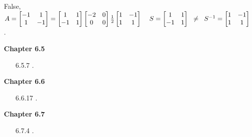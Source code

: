 \documentclass[10pt,twoside,reqno]{article}
\begin{document}
\begin{enumerate}
{%
{\addtolength{\leftskip}{5mm}
False, 
$
A=
\begin{bmatrix}
-1&1\\
1&-1\\
\end{bmatrix}
=
\begin{bmatrix}
1&1\\
-1&1\\
\end{bmatrix}
\begin{bmatrix}
-2&0\\
0&0\\
\end{bmatrix}
\frac{1}{2}
\begin{bmatrix}
1&-1\\
1&1\\
\end{bmatrix}
\hspace{4mm}
S=
\begin{bmatrix}
1&1\\
-1&1\\
\end{bmatrix}
\hspace{2mm}
\neq
\hspace{2mm}
S^{-1}=
\begin{bmatrix}
1&-1\\
1&1\\
\end{bmatrix}
$. \\
}
\vspace{3mm}
} 
\end{enumerate}
\vspace{5mm}
\textbf{Chapter 6.5}
\begin{enumerate}
\item[6.5.7]  .\\ \vspace{2mm}


\vspace{3mm}
\end{enumerate}
\vspace{5mm}
\textbf{Chapter 6.6}
\begin{enumerate}
\item[6.6.17]  .\\ \vspace{2mm}


\vspace{3mm}
\end{enumerate}
\vspace{5mm}
\textbf{Chapter 6.7}
\begin{enumerate}
\item[6.7.4]  .\\ \vspace{2mm}


\vspace{3mm}
\end{enumerate}
\end{document}

